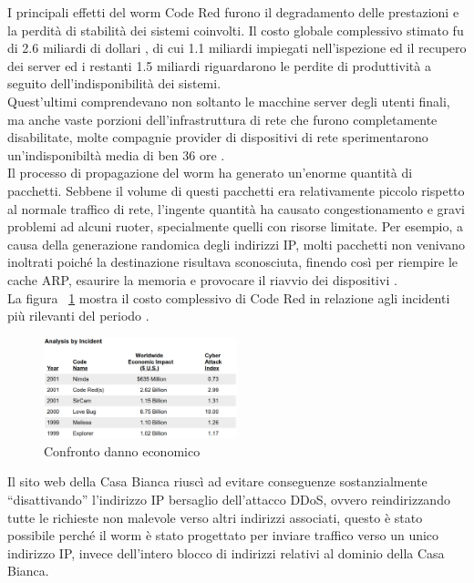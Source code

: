 I principali effetti del worm Code Red furono il degradamento delle prestazioni e la perdità di stabilità dei sistemi coinvolti. Il costo globale complessivo stimato fu di 2.6 miliardi di dollari \cite{ce, sans}, di cui 1.1 miliardi impiegati nell’ispezione ed il recupero dei server ed i restanti 1.5 miliardi riguardarono le perdite di produttività a seguito dell’indisponibilità dei sistemi.\\
Quest’ultimi comprendevano non soltanto le macchine server degli utenti finali, ma anche vaste porzioni dell’infrastruttura di rete che furono completamente disabilitate, molte compagnie provider di dispositivi di rete sperimentarono un’indisponibiltà media di ben 36 ore \cite{sans}.\\
Il processo di propagazione del worm ha generato un’enorme quantità di pacchetti. Sebbene il volume di questi pacchetti era relativamente piccolo rispetto al normale traffico di rete, l’ingente quantità ha causato congestionamento e gravi problemi ad alcuni ruoter, specialmente quelli con risorse limitate. Per esempio, a causa della generazione randomica degli indirizzi IP, molti pacchetti non venivano inoltrati poiché la destinazione risultava sconosciuta, finendo così per riempire le cache ARP, esaurire la memoria e provocare il riavvio dei dispositivi \cite{cisco}.\\
La figura ~\ref{impatto} mostra il costo complessivo di Code Red in relazione agli incidenti più rilevanti del periodo \cite{ce}.

\begin{figure}[!hbp]
\centering
\includegraphics[width=0.5\textwidth]{images/impatto.eps}
\caption{Confronto danno economico}
\label{impatto}
\end{figure}

Il sito web della Casa Bianca riuscì ad evitare conseguenze sostanzialmente “disattivando” l’indirizzo IP bersaglio dell’attacco DDoS, ovvero reindirizzando tutte le richieste non malevole verso altri indirizzi associati, questo è stato possibile perché il worm è stato progettato per inviare traffico verso un unico indirizzo IP, invece dell’intero blocco di indirizzi relativi al dominio della Casa Bianca.

